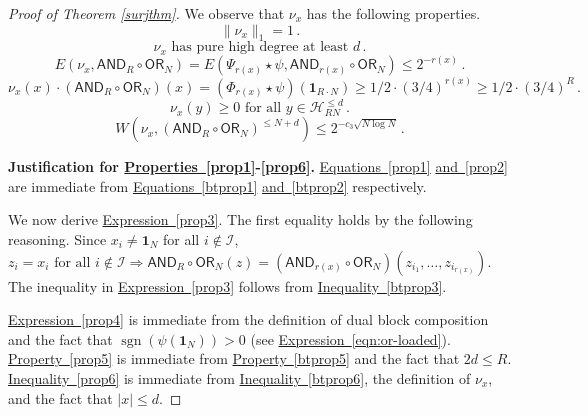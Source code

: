 \documentclass[11pt]{article}
\numberwithin{equation}{section}
\theoremstyle{definition}
\theoremstyle{plain}
\newcommand{\expeqref}[2]{\hyperref[#2]{#1~\eqref{#2}}}
\newcommand{\sgn}{\mathrm{sign}}
\newcommand{\OR}{\mathsf{ OR}}
\newcommand{\ls}{\star}
\newcommand{\Hcal}{\mathcal{H}}
\newcommand{\AND}{\mathsf{AND}}
\renewcommand{\sgn}{\operatorname{sgn}}
\begin{document}
\begin{proof}[Proof of Theorem \ref{surjthm}]
%
%
%
We observe that $\nu_x$ has the following properties. %
%
	\begin{equation}
	\label{prop1}
	\|\nu_x\|_1=1\,.
	\end{equation}
	\begin{equation}
	\label{prop2}
	\nu_x \text{ has pure high degree at least } d\,.
	\end{equation}
	\begin{equation} \label{prop3}
	E\left(\nu_x, \AND_R \circ \OR_N\right) = E\left(\Psi_{r(x)} \ls \psi, \AND_{r(x)} \circ \OR_N\right) \leq 2^{-r(x)}\,.
	\end{equation}
	\begin{equation} \label{prop4} 
	\nu_x(x)\cdot \left(\AND_R \circ \OR_N\right)(x) = \left(\Phi_{r(x)} \ls \psi\right)\left(\mathbf{1}_{R \cdot N}\right) \geq 1/2 \cdot (3/4)^{r(x)} \geq 1/2 \cdot (3/4)^{R}\,.
	\end{equation} 
	\begin{equation}
	\label{prop5} 
	\nu_x(y) \geq 0 \text{ for all } y \in \Hcal_{RN}^{\leq d}\,.
	\end{equation}
	\begin{equation}
	\label{prop6} 
	W\left(\nu_x, \left(\AND_R \circ \OR_N\right)^{\leq N + d}\right) \leq 2^{-c_3 \sqrt{N \log N}}\,.
	\end{equation}
	
	\medskip
\noindent \textbf{Justification for \expeqref{Properties}{prop1}-\eqref{prop6}.} 
	\expeqref{Equations}{prop1} \expeqref{and}{prop2} are immediate from \expeqref{Equations}{btprop1} \expeqref{and}{btprop2} respectively.
	
	\medskip
	
	We now derive \expeqref{Expression}{prop3}.
	The first equality holds by the following
	reasoning. Since $x_i \neq \mathbf{1}_N$ for all $i \not \in \mathcal{I}$,
	$z_i = x_i \text{ for all } i \notin \mathcal{I} \Longrightarrow 
	\AND_R \circ \OR_N(z) = \left(\AND_{r(x)} \circ \OR_N\right)(z_{i_1}, \dots, z_{i_{r(x)}})$. 
	The inequality in \expeqref{Expression}{prop3} follows from \expeqref{Inequality}{btprop3}.
	
	
	\medskip \expeqref{Expression}{prop4}
	is immediate from the definition of dual block composition and the fact that $\sgn(\psi(\mathbf{1}_N)) > 0$ (see 
	\expeqref{Expression}{eqn:or-loaded}). 
	\expeqref{Property}{prop5} is immediate from \expeqref{Property}{btprop5} and the fact that $2d \le R$. \expeqref{Inequality}{prop6} is immediate from \expeqref{Inequality}{btprop6}, the definition of $\nu_x$, and the fact that $|x| \leq d$. 
	

\end{proof}
\end{document}
